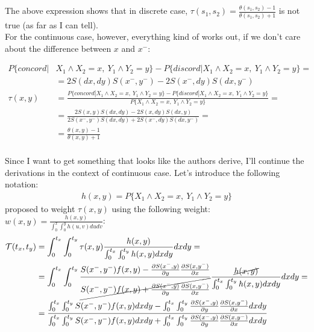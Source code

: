 \documentclass[]{article}
\begin{document}
The above expression shows that in discrete case, $\tau(s_1, s_2) = \frac{\theta(s_1, s_2) - 1}{\theta(s_1, s_2) + 1}$ is not true (as far as I can tell).
~\\
For the continuous case, however, everything kind of works out, if we don't care about the difference between $x$ and $x^-$:

  $$
  \begin{aligned}
    P\{concord| &X_{1}\wedge X_{2} = x,~Y_{1}\wedge Y_{2} = y\} - P\{discord|X_{1}\wedge X_{2} = x,~Y_{1}\wedge Y_{2} = y\} =\\
    &= 2S(dx,dy) S(x^-,y^-) - 2S(x^-,dy)S(dx,y^-)\\
    \tau(x, y) &= \frac{P\{concord| X_{1}\wedge X_{2} = x,~Y_{1}\wedge Y_{2} = y\} - P\{discord|X_{1}\wedge X_{2} = x,~Y_{1}\wedge Y_{2} = y\}}{P\{X_{1}\wedge X_{2} = x,~Y_{1}\wedge Y_{2} = y\}} = \\
     &= \frac{2S(x,y)S(dx,dy) - 2 S(x, dy)S(dx, y) }{ 2 S(x^-, y^-) S(dx, dy) + 2 S(x^-, dy) S(dx, y^-) } =\\
     &= \frac{\theta(x, y) - 1}{\theta(x, y) + 1}
  \end{aligned}
  $$
  ~\\

Since I want to get something that looks like the authors derive, I'll continue the derivations in the context of continuous case. Let's introduce the following notation:
	$$
	\begin{aligned}
		h(x, y) = P\{X_{1}\wedge X_{2} = x,~Y_{1}\wedge Y_{2} = y\}
	\end{aligned}
	$$
\cite{fan2000class} proposed to weight $\tau(x, y)$ using the following weight: $w(x, y) = \frac{h(x, y)}{\int_0^x \int_0^y h(u, v) dudv}$: 
	$$
	\begin{aligned}
		\mathcal{T}(t_x, t_y) &= \int_0^{t_x} \int_0^{t_y}  \tau(x, y)\frac{h(x, y)}{\int_0^{t_x} \int_0^{t_y} h(x, y) dxdy} dxdy = \\
    &= \int_0^{t_x} \int_0^{t_y}  \frac{S(x^-,y^-)f(x, y) - \frac{\partial S(x^-,y)}{\partial y}\frac{\partial S(x,y^-)}{\partial x} }{ \cancel{S(x^-,y^-)f(x, y) + \frac{\partial S(x^-,y)}{\partial y}\frac{\partial S(x,y^-)}{\partial x} }} \frac{\cancel{h(x, y)}}{\int_0^{t_x} \int_0^{t_y} h(x, y) dxdy} dxdy = \\
    &= \frac{ \int_0^{t_x} \int_0^{t_y} S(x^-,y^-)f(x, y)dxdy -  \int_0^{t_x} \int_0^{t_y} \frac{\partial S(x^-,y)}{\partial y}\frac{\partial S(x,y^-)}{\partial x}dxdy }{\int_0^{t_x} \int_0^{t_y} S(x^-,y^-)f(x, y)dxdy  +   \int_0^{t_x} \int_0^{t_y} \frac{\partial S(x^-,y)}{\partial y}\frac{\partial S(x,y^-)}{\partial x}dxdy }\\
	\end{aligned}
	$$
\end{document}
